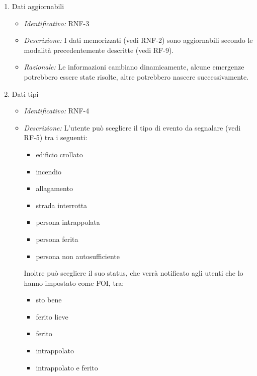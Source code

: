 \begin{enumerate}
    \item Dati aggiornabili
  \begin{itemize}
  \item\textit{Identificativo:} RNF-3
  \item\textit{Descrizione:} I dati memorizzati (vedi RNF-2) sono aggiornabili secondo le modalità precedentemente descritte (vedi RF-9).
  \item\textit{Razionale:} Le informazioni cambiano dinamicamente, alcune emergenze potrebbero essere state risolte, altre potrebbero nascere successivamente.
  \end{itemize}
  \newpage
  \item Dati tipi
  \begin{itemize}
  \item\textit{Identificativo:} RNF-4
  \item\textit{Descrizione:} L’utente può scegliere il tipo di evento da segnalare (vedi RF-5) tra i seguenti:
	\begin{itemize}
	\item edificio crollato
	\item incendio 
	\item allagamento
	\item strada interrotta
	\item persona intrappolata
	\item persona ferita
	\item persona non autosufficiente
	\end{itemize}
	Inoltre può scegliere il suo status, che verrà notificato agli utenti che lo hanno impostato come FOI, tra:
	\begin{itemize}
	\item sto bene
	\item ferito lieve
	\item ferito
	\item intrappolato
	\item intrappolato e ferito
	\end{itemize}
  \end{itemize}
 

\end{enumerate}
